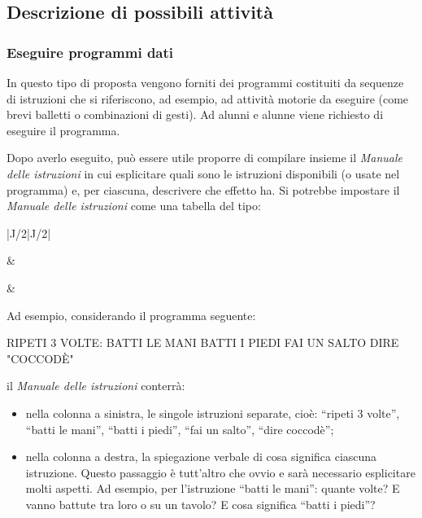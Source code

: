 \subsection{Descrizione di possibili attività }\label{descrizione-di-possibili-attivituxe0}

\subsubsection{Eseguire programmi dati}

\ruoliattivita{\ruoloEsecutore}

In questo tipo di proposta vengono forniti dei programmi costituiti da sequenze di istruzioni che si riferiscono, ad esempio, ad attività motorie da eseguire (come brevi balletti o combinazioni di gesti). Ad alunni e alunne viene richiesto di eseguire il programma.


Dopo averlo eseguito, può essere utile proporre di compilare insieme il \emph{Manuale delle istruzioni} in cui esplicitare quali sono le istruzioni disponibili (o usate nel programma) e, per ciascuna, descrivere che effetto ha. Si potrebbe impostare il \emph{Manuale delle istruzioni} come una tabella del tipo:


\begin{center}
\manualeimpostazioni
\begin{tabular}{|J{\arrayrulewidth/2\relax}|J{\arrayrulewidth/2\relax}|}
\hline
{}
\manualeintestazione
\rule{0pt}{1.4em} & \\
\hline
\rule{0pt}{1.4em} & \\
\hline
\end{tabular}
\manualeripristinacolore
\end{center}



Ad esempio, considerando il programma seguente:

\begin{pseudocodice}
RIPETI 3 VOLTE:
    BATTI LE MANI
    BATTI I PIEDI
    FAI UN SALTO
    DIRE "COCCODÈ"
\end{pseudocodice}


il \emph{Manuale delle istruzioni} conterrà:

\begin{itemize}
\item
  nella colonna a sinistra, le singole istruzioni separate, cioè: ``ripeti 3 volte'', ``batti le mani'', ``batti i piedi'', ``fai un salto'', ``dire coccodè'';
\item
  nella colonna a destra, la spiegazione verbale di cosa significa ciascuna istruzione. Questo passaggio è tutt'altro che ovvio e sarà necessario esplicitare molti aspetti. Ad esempio, per l'istruzione ``batti le mani'': quante volte? E vanno battute tra loro o su un tavolo? E cosa significa ``batti i piedi''?
\end{itemize}

